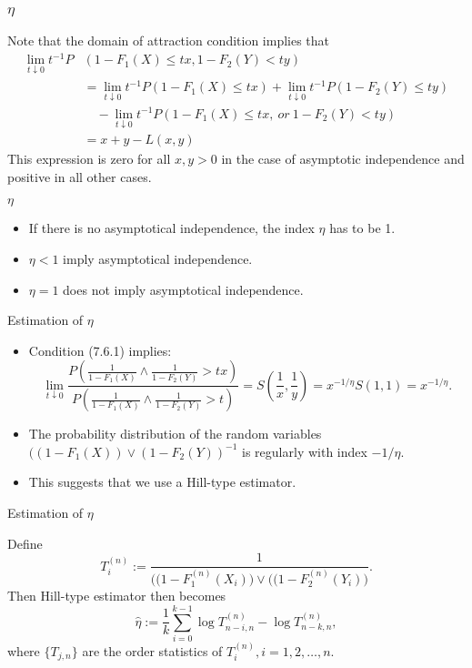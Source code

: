 \documentclass[11pt]{beamer}
\begin{document}
\begin{frame}
	\frametitle{$\eta$}
Note that the domain of attraction condition implies that 
$$
\begin{aligned}
	\lim_{t\downarrow 0} t^{-1} P&(1-F_1(X)\le tx,1-F_2(Y)<ty)\\
	& =\lim_{t\downarrow 0} t^{-1} P(1-F_1(X)\le tx)+\lim_{t\downarrow 0} t^{-1}P(1-F_2(Y)\le ty)\\
	&\quad - \lim_{t\downarrow 0} t^{-1}P(1-F_1(X)\le tx, \ or \ 1-F_2(Y)<ty)\\
	&=x+y-L(x,y)
\end{aligned}
$$
This expression is zero for all $x,y>0$ in the case of asymptotic independence and positive	in all other cases.

\end{frame}

\begin{frame}{$\eta$}
\begin{itemize}
\item If there is no  asymptotical independence, the index $\eta$ has to be 1.
\bigskip
\item $\eta<1$ imply asymptotical independence.
\bigskip
\item $\eta=1$ does not imply asymptotical independence. 
\end{itemize}
\end{frame}

\begin{frame}{Estimation of $\eta$}
\begin{itemize}
\item Condition (7.6.1) implies:
\begin{displaymath}
\lim_{t\downarrow 0}\dfrac{ P( \frac{1}{1-F_1(X)}\land \frac{1}{1-F_2(Y)}>tx)}{P(\frac{1}{1-F_1(X)}\land \frac{1}{1-F_2(Y)}>t )} =S(\frac{1}{x},\frac{1}{y})=x^{-1/\eta}S(1,1)=x^{-1/\eta}.
\end{displaymath} 
\item The probability distribution of the random variables $((1-F_1(X))\lor (1-F_2(Y))^{-1}$ is regularly with index $-1/\eta$.
\item This suggests that we use a Hill-type estimator.
\end{itemize}
\end{frame}

\begin{frame}{Estimation of $\eta$}

Define 
\begin{displaymath}
T_i^{(n)}:=\dfrac{1}{\big( (1-F_1^{(n)}(X_i)\big) \lor \big( (1-F_2^{(n)}(Y_i)\big)}.
\end{displaymath}
Then Hill-type estimator then becomes
\begin{displaymath}
\hat{\eta}:=\frac{1}{k}\sum_{i=0}^{k-1} \log T_{n-i,n}^{(n)}-\log T_{n-k,n}^{(n)},
\end{displaymath}
where $\{T_{j,n}\}$ are the order statistics of $T_i^{(n)}, i=1,2,\dots,n$.
\end{frame}
\end{document}
